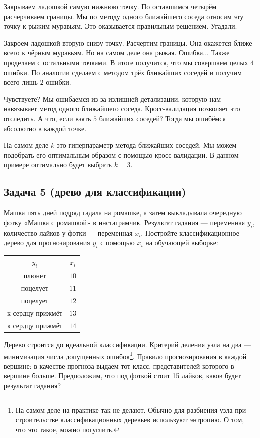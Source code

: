 \documentclass[12pt, a4paper, oneside]{article}
\begin{document}
{\begin{enumerate}
		Закрываем ладошкой самую нижнюю точку. По оставшимся четырём расчерчиваем границы. Мы по методу одного ближайшего соседа относим эту точку к рыжим муравьям. Это оказывается правильным решением. Угадали.
		
		Закроем ладошкой вторую снизу точку. Расчертим границы. Она окажется ближе всего к чёрным муравьям. Но на самом деле она рыжая. Ошибка... Также проделаем с остальными точками. В итоге получится, что мы совершаем целых $4$ ошибки. По аналогии сделаем с методом трёх ближайших соседей и получим всего лишь $2$ ошибки. 
		
		Чувствуете? Мы ошибаемся из-за излишней детализации, которую нам навязывает метод одного ближайшего соседа. Кросс-валидация позволяет это отследить. А что, если взять $5$ ближайших соседей? Тогда мы ошибёмся абсолютно в каждой точке.
		
		На самом деле $k$ это гиперпараметр метода ближайших соседей. Мы можем подобрать его оптимальным образом с помощью кросс-валидации. В данном примере оптимально будет выбрать $k=3$.  
	\end{enumerate}
}



\subsection*{Задача 5 (древо для классификации)}

Машка пять дней подряд гадала на ромашке, а затем выкладывала очередную фотку «Машка с ромашкой» в инстаграмчик. Результат гадания — переменная $y_i$, количество лайков у фотки — переменная $x_i$. Постройте классификационное дерево для прогнозирования $y_i$ с помощью $x_i$ на обучающей выборке:

\begin{center}
	\begin{tabular}{cc}
		$y_i$ & $x_i$ \\
		\hline
		плюнет & $10$ \\
		поцелует & $11$ \\
		поцелует & $12$ \\
		к сердцу прижмёт & $13$ \\
		к сердцу прижмёт & $14$ \\
	\end{tabular}
\end{center}

Дерево строится до идеальной классификации. Критерий деления узла на два — минимизация числа допущенных ошибок\footnote{На самом деле на практике так не делают. Обычно для разбиения узла при строительстве классификационных деревьев используют энтропию. О том, что это такое, можно погуглить.}.  Правило прогнозирования в каждой вершине: в качестве прогноза выдаем тот класс, представителей которого в вершине больше.  Предположим, что под фоткой стоит 15 лайков, каков будет результат гадания? 
\end{document}
